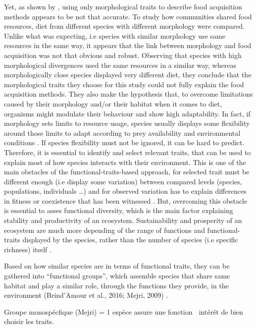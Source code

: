 \documentclass[a4paper, 12pt]{article}
\begin{document}
Yet, as shown by \citep{grossman2009}, using only morphological traits to describe food acquisition methods appears to be not that accurate. To study how communities shared food resources, diet from different species with different morphology were compared. Unlike what was expecting, i.e species with similar morphology use same resources in the same way, it appears that the link between morphology and food acquisition was not that obvious and robust. Observing that species with high morphological divergences used the same resources in a similar way, whereas morphologically close species displayed very different diet, they conclude that the morphological traits they choose for this study could not fully explain the food acquisition methods. They also make the hypothesis that, to overcome limitations caused by their morphology and/or their habitat when it comes to diet, organisms might modulate their behaviour and show high adaptability. In fact, if morphology sets limits to resource usage, species usually displays some flexibility around those limits to adapt according to prey availability and environmental conditions \citep{ibanez2007}. 
If species flexibility must not be ignored, it can be hard to predict. Therefore, it is essential to identify and select relevant traits, that can be used to explain most of how species interacts with their environment. This is one of the main obstacles of the functional-traits-based approach, for selected trait must be different enough (i.e display some variation) between compared levels (species, populations, individuals …) and for observed variation has to explain differences in fitness or coexistence that has been witnessed \citep{kremer2017}. 
But, overcoming this obstacle is essential to asses functional diversity, which is the main factor explaining stability and productivity of an ecosystem. Sustainability and prosperity of an ecosystem are much more depending of the range of functions and functional-traits displayed by the species, rather than the number of species (i.e specific richness) itself \citep{mejri2009}.

Based on how similar species are in terms of functional traits, they can be gathered into “functional groups”, which assemble species that share same habitat and play a similar role, through the functions  they provide, in the environment (Brind’Amour et al., 2016; Mejri, 2009) \citep{brindamour2016, mejri2009}.

Groupe monospécfique (Mejri) = 1 espèce assure une fonction  intérêt de bien choisir les traits. 
\end{document}
